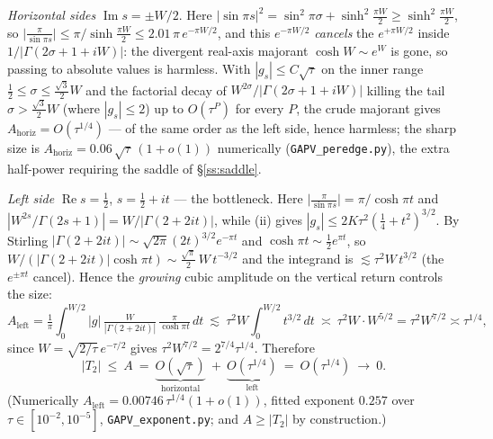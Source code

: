 \begin{lemma}[Absolute contour bound: $|T_2|=O(\tau^{1/4})\to0$, no oscillatory cancellation]
\emph{Horizontal sides} $\operatorname{Im}s=\pm W/2$. Here $|{\sin\pi s}|^2=\sin^2\pi\sigma+\sinh^2\tfrac{\pi W}2
\ge\sinh^2\tfrac{\pi W}2$, so $\bigl|\tfrac\pi{\sin\pi s}\bigr|\le\pi/\sinh\tfrac{\pi W}2\le2.01\,\pi\,e^{-\pi W/2}$,
and this $e^{-\pi W/2}$ \emph{cancels} the $e^{+\pi W/2}$ inside $1/|\Gamma(2\sigma+1+iW)|$: the divergent real-axis
majorant $\cosh W\sim e^{W}$ is gone, so passing to absolute values is harmless. With $|g_s|\le C\sqrt\tau$ on the
inner range $\tfrac12\le\sigma\le\tfrac{\sqrt3}2W$ and the factorial decay of $W^{2\sigma}/|\Gamma(2\sigma+1+iW)|$
killing the tail $\sigma>\tfrac{\sqrt3}2W$ (where $|g_s|\le2$) up to $O(\tau^P)$ for every $P$, the crude
majorant gives $A_{\mathrm{horiz}}=O(\tau^{1/4})$ --- of the same order as the left side, hence harmless;
the sharp size is $A_{\mathrm{horiz}}=0.06\,\sqrt\tau\,(1+o(1))$ numerically (\texttt{GAPV\_peredge.py}), the
extra half-power requiring the saddle of \S\ref{ss:saddle}.

\emph{Left side} $\operatorname{Re}s=\tfrac12$, $s=\tfrac12+it$ --- the bottleneck. Here
$\bigl|\tfrac\pi{\sin\pi s}\bigr|=\pi/\cosh\pi t$ and $|W^{2s}/\Gamma(2s{+}1)|=W/|\Gamma(2+2it)|$, while (ii) gives
$|g_s|\le 2K\tau^2(\tfrac14+t^2)^{3/2}$. By Stirling $|\Gamma(2+2it)|\sim\sqrt{2\pi}(2t)^{3/2}e^{-\pi t}$ and
$\cosh\pi t\sim\tfrac12e^{\pi t}$, so $W/(|\Gamma(2+2it)|\cosh\pi t)\sim\tfrac{\sqrt\pi}2\,W\,t^{-3/2}$ and the
integrand is $\lesssim\tau^2W\,t^{3/2}$ (the $e^{\pm\pi t}$ cancel). Hence the \emph{growing} cubic amplitude on the
vertical return controls the size:
\[
   A_{\mathrm{left}}=\tfrac1\pi\!\int_0^{W/2}\!\!|g|\,\tfrac{W}{|\Gamma(2+2it)|}\,\tfrac\pi{\cosh\pi t}\,dt
   \ \lesssim\ \tau^2W\!\int_0^{W/2}\!\! t^{3/2}\,dt\ \asymp\ \tau^2W\cdot W^{5/2}=\tau^2W^{7/2}\asymp\tau^{1/4},
\]
since $W=\sqrt{2/\tau}\,e^{-\tau/2}$ gives $\tau^2W^{7/2}=2^{7/4}\tau^{1/4}$. Therefore
\[
   |T_2|\ \le\ A\ =\ \underbrace{O(\sqrt\tau)}_{\text{horizontal}}\ +\ \underbrace{O(\tau^{1/4})}_{\text{left}}
   \ =\ O(\tau^{1/4})\ \longrightarrow\ 0 .
\]
\textup(Numerically $A_{\mathrm{left}}=0.00746\,\tau^{1/4}(1+o(1))$, fitted exponent $0.257$ over
$\tau\in[10^{-2},10^{-5}]$, \texttt{GAPV\_exponent.py}; and $A\ge|T_2|$ by construction.\textup)
\end{lemma}

